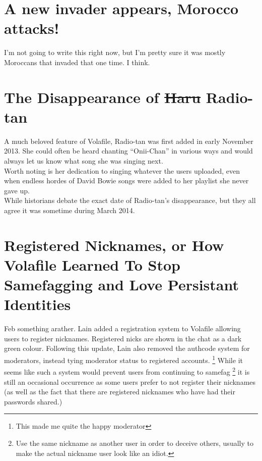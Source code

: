 \documentclass[12pt]{report}
\begin{document}
{        \section{A new invader appears, Morocco attacks!}
        I'm not going to write this right now, but I'm pretty
        sure it was mostly Moroccans that invaded that one time.
        I think.

        \section[The Disappearance of  Radio-tan]{The Disappearance of \sout{Haru} Radio-tan\footnotemark}
        A much beloved feature of Volafile, Radio-tan was first
        added in early November 2013. She could often be heard chanting
        ``Onii-Chan'' in various ways and would always let us know what
        song she was singing next.\\
	Worth noting is her dedication to singing whatever the users
        uploaded, even when endless hordes of David Bowie songs were
        added to her playlist she never gave up.\\
	While historians debate the exact date of Radio-tan's disappearance,
        but they all agree it was sometime during March 2014.

        \vfill
        \pagebreak

        \section[Registered Nicknames]{Registered Nicknames, or How Volafile Learned To Stop Samefagging and Love Persistant Identities\footnotemark}
        Feb something arather. Lain added a registration system to Volafile
        allowing users to register nicknames. Registered nicks are shown
        in the chat as a dark green colour. Following this update, Lain
        also removed the authcode system for moderators, instead tying
        moderator status to registered accounts.
	\footnote{This made me quite the happy moderator}
        While it seems like such a system would prevent users from continuing to samefag
	\footnote{Use the same nickname as another user in order to deceive others, usually to make the actual nickname user look like an idiot.}
        it is still an occasional occurrence as some users prefer to not register their
        nicknames (as well as the fact that there are registered nicknames who have had their passwords shared.)

}
\end{document}
